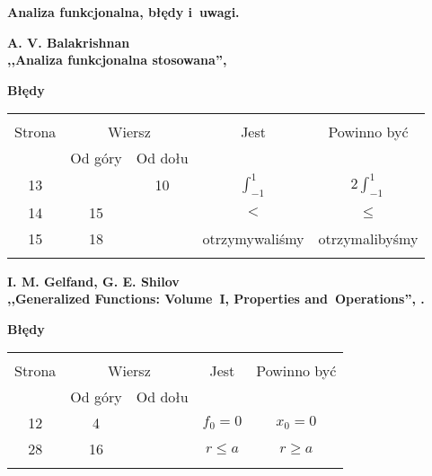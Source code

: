 \documentclass[a4paper,11pt]{article}
\newcommand{\spaceOne}{2em}
\newcommand{\spaceTwo}{1em}
\newcommand{\tb}{\textbf}
\newcommand{\Center}[1]{\begin{center} #1 \end{center}}
\newcommand{\CenterTB}[1]{\Center{\tb{#1}}}
\newcommand{\Work}[1]{ \begin{center} {\large \tb{#1}} \end{center} }
\newcommand{\Main}[1]{ \begin{center} {\LARGE \tb{#1} } \end{center} }
\begin{document}



\Main{Analiza funkcjonalna, błędy i~uwagi.}

\vspace{\spaceTwo}



\Work{
  A. V. Balakrishnan \\
  ,,Analiza funkcjonalna stosowana'', \cite{Bal92}}


\CenterTB{Błędy}
\begin{center}
  \begin{tabular}{|c|c|c|c|c|}
    \hline
    & \multicolumn{2}{c|}{} & & \\
    Strona & \multicolumn{2}{c|}{Wiersz}& Jest & Powinno być \\ \cline{2-3}
    & Od góry & Od dołu &  &  \\ \hline
    13 & & 10 & $\int^{ 1 }_{ -1 }$ & $2 \int^{ 1 }_{ -1 }$ \\
    14 & 15 & & $<$ & $\leq$ \\
    15 & 18 & & otrzymywaliśmy & otrzymalibyśmy \\
    & & & & \\ \hline
  \end{tabular}
\end{center}

\vspace{\spaceOne}



\Work{
  I. M. Gelfand, G. E. Shilov \\
  ,,Generalized Functions: Volume~I, Properties and~Operations'',
  \cite{GS64}. }


\CenterTB{Błędy}
\begin{center}
  \begin{tabular}{|c|c|c|c|c|}
    \hline
    & \multicolumn{2}{c|}{} & & \\
    Strona & \multicolumn{2}{c|}{Wiersz}& Jest & Powinno być \\ \cline{2-3}
    & Od góry & Od dołu &  &  \\ \hline
    12 & 4 & & $f_{ 0 } = 0$ & $x_{ 0 } = 0$ \\
    28 & 16 & & $r \leq a$ & $r \geq a$ \\
    & & & & \\ \hline
  \end{tabular}
\end{center}
\end{document}

